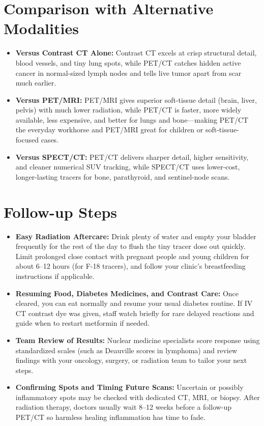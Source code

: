 \section{Comparison with Alternative Modalities}

\begin{itemize}
    \item \textbf{Versus Contrast CT Alone:} Contrast CT excels at crisp structural detail, blood vessels, and tiny lung spots, while PET/CT catches hidden active cancer in normal-sized lymph nodes and tells live tumor apart from scar much earlier.
    \item \textbf{Versus PET/MRI:} PET/MRI gives superior soft-tissue detail (brain, liver, pelvis) with much lower radiation, while PET/CT is faster, more widely available, less expensive, and better for lungs and bone---making PET/CT the everyday workhorse and PET/MRI great for children or soft-tissue-focused cases.
    \item \textbf{Versus SPECT/CT:} PET/CT delivers sharper detail, higher sensitivity, and cleaner numerical SUV tracking, while SPECT/CT uses lower-cost, longer-lasting tracers for bone, parathyroid, and sentinel-node scans.
\end{itemize}

\section{Follow-up Steps}

\begin{itemize}
    \item \textbf{Easy Radiation Aftercare:} Drink plenty of water and empty your bladder frequently for the rest of the day to flush the tiny tracer dose out quickly. Limit prolonged close contact with pregnant people and young children for about 6--12 hours (for F-18 tracers), and follow your clinic's breastfeeding instructions if applicable.
    \item \textbf{Resuming Food, Diabetes Medicines, and Contrast Care:} Once cleared, you can eat normally and resume your usual diabetes routine. If IV CT contrast dye was given, staff watch briefly for rare delayed reactions and guide when to restart metformin if needed.
    \item \textbf{Team Review of Results:} Nuclear medicine specialists score response using standardized scales (such as Deauville scores in lymphoma) and review findings with your oncology, surgery, or radiation team to tailor your next steps.
    \item \textbf{Confirming Spots and Timing Future Scans:} Uncertain or possibly inflammatory spots may be checked with dedicated CT, MRI, or biopsy. After radiation therapy, doctors usually wait 8--12 weeks before a follow-up PET/CT so harmless healing inflammation has time to fade.
\end{itemize}

